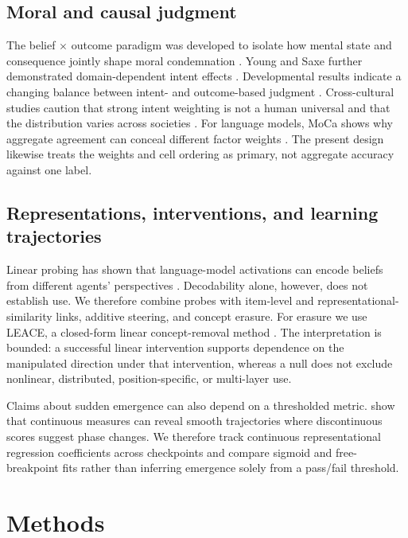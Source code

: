 \documentclass[11pt]{article}
\begin{document}
\subsection{Moral and causal judgment}

The belief $\times$ outcome paradigm was developed to isolate how mental state and consequence jointly shape moral condemnation \citep{young2007neural,young2008belief,young2009innocent}.
Young and Saxe further demonstrated domain-dependent intent effects \citep{young2011ignorance}.
Developmental results indicate a changing balance between intent- and outcome-based judgment \citep{cushman2013development}.
Cross-cultural studies caution that strong intent weighting is not a human universal and that the distribution varies across societies \citep{barrett2016societies,curtin2020kinship}.
For language models, MoCa shows why aggregate agreement can conceal different factor weights \citep{nie2023moca}.
The present design likewise treats the weights and cell ordering as primary, not aggregate accuracy against one label.

\subsection{Representations, interventions, and learning trajectories}

Linear probing has shown that language-model activations can encode beliefs from different agents' perspectives \citep{zhu2024beliefs}.
Decodability alone, however, does not establish use.
We therefore combine probes with item-level and representational-similarity links, additive steering, and concept erasure.
For erasure we use LEACE, a closed-form linear concept-removal method \citep{belrose2023leace}.
The interpretation is bounded: a successful linear intervention supports dependence on the manipulated direction under that intervention, whereas a null does not exclude nonlinear, distributed, position-specific, or multi-layer use.

Claims about sudden emergence can also depend on a thresholded metric.
\citet{schaeffer2023emergent} show that continuous measures can reveal smooth trajectories where discontinuous scores suggest phase changes.
We therefore track continuous representational regression coefficients across checkpoints and compare sigmoid and free-breakpoint fits rather than inferring emergence solely from a pass/fail threshold.

\section{Methods}
\end{document}
